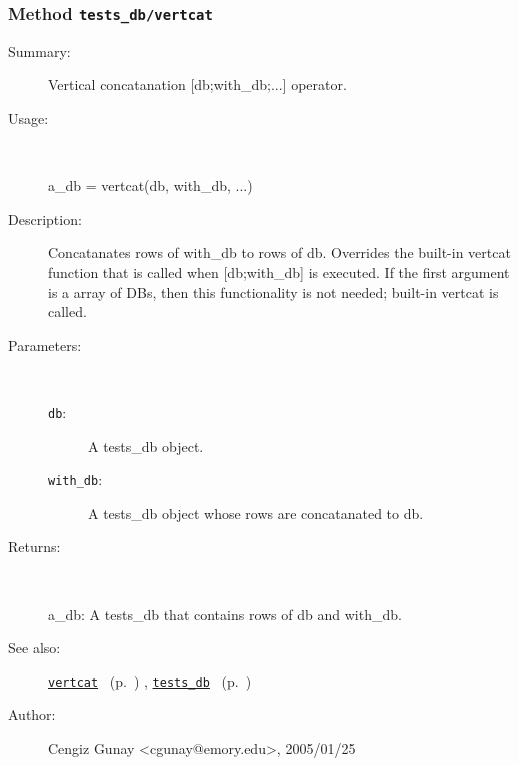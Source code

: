 \subsubsection[Method \texttt{vertcat}]{Method \texttt{tests\_db/vertcat}}%
%
\label{ref_tests_db__vertcat}%
\hypertarget{ref_tests_db__vertcat}{}%
\begin{description}
\item[Summary:]Vertical concatanation [db;with\_db;...] operator.
%
\item[Usage:]~%
\begin{lyxcode}%
a\_db = vertcat(db, with\_db, ...)
%
\end{lyxcode}%
%
\item[Description:]%
Concatanates rows of with\_db to rows of db. Overrides the built-in
 vertcat function that is called when [db;with\_db] is executed. If the 
 first argument is a array of DBs, then this functionality is not needed;
 built-in vertcat is called.
\item[Parameters:]~
\begin{description}%
\item[\texttt{db}:]
 A tests\_db object.
\item[\texttt{with\_db}:]
 A tests\_db object whose rows are concatanated to db.
\end{description}%
%
\item[Returns:]~

	a\_db: A tests\_db that contains rows of db and with\_db.
%
%
\item[See also:]%
\hyperlink{ref_vertcat}{\texttt{vertcat}}%
\ (p.~\pageref{ref_vertcat})%
%
, \hyperlink{ref_tests_db}{\texttt{tests\_db}}%
\ (p.~\pageref{ref_tests_db})%
%
%
\item[Author:]%
Cengiz Gunay <cgunay@emory.edu>, 2005/01/25%
\end{description}
\methodline%
